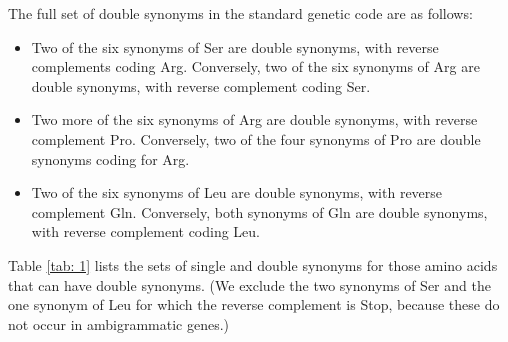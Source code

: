 \documentclass[unnumsec,webpdf,contemporary,large,namedate]{oup-authoring-template}%
\theoremstyle{thmstyleone}%
\theoremstyle{thmstyletwo}%
\theoremstyle{thmstylethree}%
\begin{document}
The full set of double synonyms in the standard genetic code are as follows:

\begin{itemize}

\item Two of the six synonyms of Ser are double synonyms, with reverse complements coding Arg. 
Conversely, two of the six synonyms of Arg are double synonyms, with reverse complement coding Ser.

\item Two more of the six synonyms of Arg are double synonyms, with reverse complement Pro. 
Conversely, two of the four synonyms of Pro are double synonyms coding for Arg.

\item Two of the six synonyms of Leu are double synonyms, with reverse complement Gln.
Conversely, both synonyms of Gln are double synonyms, with reverse complement coding Leu. 

\end{itemize}

Table \ref{tab: 1} lists the sets of single and double synonyms for those amino acids 
that can have double synonyms. (We exclude the two synonyms of Ser and the one synonym
of Leu for which the reverse complement is Stop, because these do not occur in ambigrammatic
genes.) 
\end{document}
